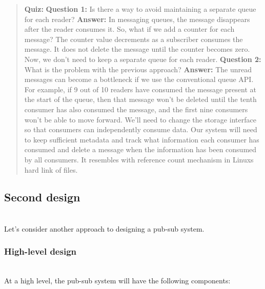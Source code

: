 \begin{quote}
\textbf{Quiz:}
\textbf{Question 1:} Is there a way to avoid maintaining a separate queue for each reader?
\textbf{Answer:} In messaging queues, the message disappears after the reader consumes it. So, what if we add a counter for each message? The counter value decrements as a subscriber consumes the message. It does not delete the message until the counter becomes zero. Now, we don't need to keep a separate queue for each reader.
\textbf{Question 2:} What is the problem with the previous approach?
\textbf{Answer:} The unread messages can become a bottleneck if we use the conventional queue API. For example, if 9 out of 10 readers have consumed the message present at the start of the queue, then that message won't be deleted until the tenth consumer has also consumed the message, and the first nine consumers won't be able to move forward. We'll need to change the storage interface so that consumers can independently consume data. Our system will need to keep sufficient metadata and track what information each consumer has consumed and delete a message when the information has been consumed by all consumers. It resembles with reference count mechanism in Linux\textquotesingle s hard link of files.
\end{quote}

\subsection{Second design}\label{nwbvqM9Ct2Ll2eWXtUtWA}
\\
Let's consider another approach to designing a pub-sub system.

\subsubsection{High-level design}\label{2LCZMS7RMXLiMFKKDcrnn}
\\
At a high level, the pub-sub system will have the following components:

